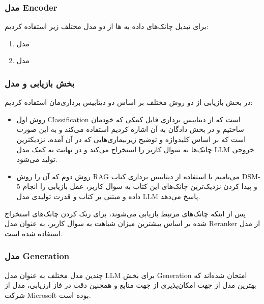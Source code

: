 \documentclass{CCI2020}
\begin{document}
\subsubsection{مدل Encoder}
برای تبدیل چانک‌های داده به ها از دو مدل  مختلف زیر استفاده کردیم:
\begin{enumerate}
    \item مدل \href{https://huggingface.co/thenlper/gte-small}{}\cite{li2023towards}
    \item مدل \href{https://huggingface.co/sentence-transformers/all-MiniLM-L6-v2}{}\cite{minilm}
\end{enumerate}

\subsubsection{بخش بازیابی و مدل }
در بخش بازیابی از دو روش مختلف بر اساس دو دیتابیس برداری‌مان استفاده کردیم:

\begin{itemize}
    \item روش اول Classification است که از دیتابیس برداری فایل کمکی که خودمان ساختیم و در بخش دادگان به آن اشاره کردیم استفاده می‌کند و به این صورت است که بر اساس کلیدواژه و توضیح زیربیماری‌هایی که در آن آمده، نزدیکترین چانک‌ها به سوال کاربر را استخراج می‌کند و در نهایت به کمک مدل LLM خروجی تولید می‌شود.
    \item روش دوم که آن را روش RAG می‌نامیم با استفاده از دیتابیس برداری کتاب DSM-5 و پیدا کردن نزدیک‌ترین چانک‌های این کتاب به سوال کاربر، عمل بازیابی را انجام داده و مبتنی بر کتاب و قدرت تولیدی مدل LLM پاسخ می‌دهد.
\end{itemize}

پس از اینکه چانک‌های مرتبط بازیابی می‌شوند، برای رنک کردن چانک‌های استخراج شده بر اساس بیشترین میزان شباهت به سوال کاربر، به عنوان مدل Reranker از مدل \href{https://huggingface.co/colbert-ir/colbertv2.0}{}\cite{ColBERTv2} استفاده شده است. 

\subsubsection{مدل Generation}
چندین مدل مختلف به عنوان مدل LLM برای بخش Generation امتحان شده‌اند که بهترین مدل از جهت امکان‌پذیری از جهت منابع و همچنین دقت در فاز ارزیابی، مدل \href{https://huggingface.co/microsoft/Phi-3-mini-128k-instruct}{} از شرکت Microsoft بوده است.    
\end{document}
